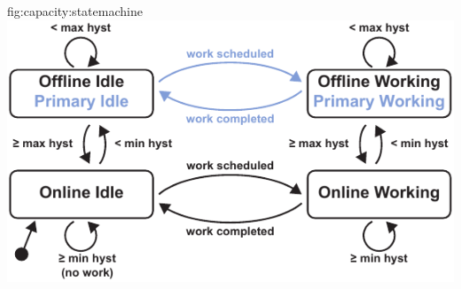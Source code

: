 \begin{definefigure}{fig:capacity:statemachine}
    \centering
    \includegraphics[width=\columnwidth]{figs/capacity/model_state_machine}
    \caption{\normalfont Model state machine.
    A modeled device can be in one of four states: \textsf{Offline Idle},
    \textsf{Online Idle}, \textsf{Online Working}, and \textsf{Offline
    Working}. When a device is \textsf{Offline Idle}, it has run out of energy
    and is off. If a device is \textsf{Online
    Idle}, it is on and in deep sleep, ready to perform work if triggered. If
    triggered, a device moves to \textsf{Online Working}, where it performs a
    portion of a work event.  If a workload is atomic, workload events
    \textit{must} be completed in one \textsf{Online Working} step, without any
    transitions to an offline state.  \textsf{Offline Working} means that while
    working on a non-atomic task, the device ran out of energy, checkpointed,
    and is waiting to harvest more and resume its task.  For devices
    configured with a primary-cell, \textsf{Offline Idle} and \textsf{Offline
    Working} become \textsf{\textcolor{primary-blue}{Primary Idle}} and
    \textsf{\textcolor{primary-blue}{Primary Working}} respectively.  In these
    states, outgoing energy is charged against the primary-cell and the device
    remains online and able to perform work for the life of the primary-cell.
    }
\end{definefigure}

